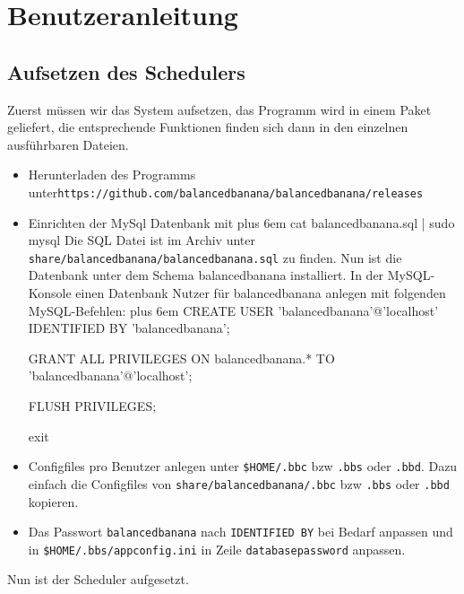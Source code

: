 \documentclass[a4paper,12pt]{article}
\makeatletter
\newenvironment{mycode}
 {\def\@xobeysp{\ }\verbatim\rightskip=0pt plus 6em\relax}
 {\endverbatim}
\makeatother
\begin{document}
\section{Benutzeranleitung}
\subsection{Aufsetzen des Schedulers}
\vspace{0.2cm}
Zuerst müssen wir das System aufsetzen, das Programm wird in einem Paket geliefert, die entsprechende Funktionen finden sich dann in den einzelnen ausführbaren Dateien.
\begin{itemize}[label={\textbullet}]
    \item Herunterladen des Programms unter\newline \texttt{https://github.com/balancedbanana/balancedbanana/releases}
    \item Einrichten der MySql Datenbank mit \newline
    \begin{mycode}
    cat balancedbanana.sql | sudo mysql
    \end{mycode}
    Die SQL Datei ist im Archiv unter \newline \texttt{share/balancedbanana/balancedbanana.sql} \newline
    zu finden.\newline
    Nun ist die Datenbank unter dem Schema balancedbanana installiert.
    In der MySQL-Konsole einen Datenbank Nutzer für balancedbanana anlegen mit folgenden MySQL-Befehlen:
    \begin{mycode}
    CREATE USER 'balancedbanana'@'localhost' IDENTIFIED BY 
    'balancedbanana';
    	
    GRANT ALL PRIVILEGES ON balancedbanana.* TO 'balancedbanana'@'localhost';
        
    FLUSH PRIVILEGES;
        
    exit
    \end{mycode}
    \item Configfiles pro Benutzer anlegen unter \newline
    \texttt{\$HOME/.bbc} bzw \texttt{.bbs} oder \texttt{.bbd}. \newline
    Dazu einfach die Configfiles von \newline
    \texttt{share/balancedbanana/.bbc} bzw \texttt{.bbs} oder \texttt{.bbd} \newline
    kopieren.
    \item  Das Passwort \texttt{balancedbanana} nach \texttt{IDENTIFIED BY} bei Bedarf anpassen und in \newline
    \texttt{\$HOME/.bbs/appconfig.ini} \newline
    in Zeile \texttt{databasepassword} anpassen. \newline
    
\end{itemize}
Nun ist der Scheduler aufgesetzt.
\end{document}
